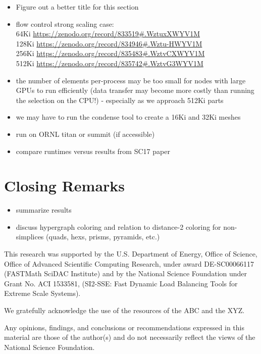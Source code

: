 \documentclass[graybox]{svmult}
\begin{document}
\begin{itemize}
  \item Figure out a better title for this section
  \item flow control strong scaling case: \\
64Ki \url{https://zenodo.org/record/833519#.WztuxXWYV1M} \\
128Ki \url{https://zenodo.org/record/834946#.Wztu-HWYV1M} \\
256Ki \url{https://zenodo.org/record/835483#.WztvCXWYV1M} \\
512Ki \url{https://zenodo.org/record/835742#.WztvG3WYV1M}
  \item the number of elements per-process may be too small for nodes with large GPUs to run efficiently (data transfer may become more costly than running the selection on the CPU!) - especially as we approach 512Ki parts
  \item we may have to run the condense tool to create a 16Ki and 32Ki meshes
  \item run on ORNL titan or summit (if accessible)
  \item compare runtimes versus results from SC17 paper~\cite{engparSC17}
\end{itemize}

\section{Closing Remarks} \label{sec:closing}
\begin{itemize}
  \item summarize results
  \item discuss hypergraph coloring and relation to distance-2 coloring for non-simplices (quads, hexs, prisms, pyramids, etc.)
\end{itemize}

\begin{acknowledgement}
This research was supported by the U.S. Department of Energy, Office of Science,
Office of Advanced Scientific Computing Research, under award DE-SC00066117
(FASTMath SciDAC Institute) and by the National Science Foundation under Grant
No. ACI 1533581, (SI2-SSE: Fast Dynamic Load Balancing Tools for Extreme Scale
Systems).

We gratefully acknowledge the use of the resources of the ABC and the XYZ.

Any opinions, findings, and conclusions or recommendations expressed in this
material are those of the author(s) and do not necessarily reflect the views
of the National Science Foundation.
\end{acknowledgement}



\end{document}
